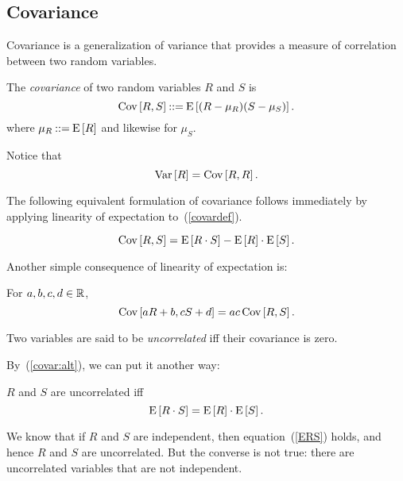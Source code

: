 \documentclass[11pt,twoside]{article}
\begin{document}

\subsection{Covariance}
Covariance is a generalization of variance that provides a measure of
correlation between two random variables.

\begin{definition*}
The \emph{covariance} of two random variables $R$ and $S$ is
\begin{equation}\label{covardef}
\mathop{\textup{Cov}}\nolimits\left[R,S\right] \mathbin{::=} \mathop{\textup{E}}\nolimits\left[(R - \mu_R)(S - \mu_S)\right].
\end{equation}
where $\mu_R \mathbin{::=} \mathop{\textup{E}}\nolimits\left[R\right]$ and likewise for $\mu_S$.
\end{definition*}

Notice that
\[
\mathop{\textup{Var}}\nolimits\left[R\right] = \mathop{\textup{Cov}}\nolimits\left[R,R\right].
\]

The following equivalent formulation of covariance follows immediately by
applying linearity of expectation to~(\ref{covardef}).
\begin{lemma*}
\begin{equation}\label{covar:alt}
\mathop{\textup{Cov}}\nolimits\left[R,S\right] = \mathop{\textup{E}}\nolimits\left[R\cdot S\right] - \mathop{\textup{E}}\nolimits\left[R\right] \cdot \mathop{\textup{E}}\nolimits\left[S\right].
\end{equation}
\end{lemma*}

Another simple consequence of linearity of expectation is:
\begin{lemma*}For $a,b,c,d \in \mathbb{R}$,
\begin{equation}\label{covaraR}
\mathop{\textup{Cov}}\nolimits\left[aR+b,cS+d\right] = ac\mathop{\textup{Cov}}\nolimits\left[R,S\right].
\end{equation}
\end{lemma*}

\begin{definition*}
Two variables are said to be \emph{uncorrelated} iff their covariance is
zero.
\end{definition*}

By~(\ref{covar:alt}), we can put it another way:
\begin{lemma*}
$R$ and $S$ are uncorrelated iff
\begin{equation}\label{ERS}
\mathop{\textup{E}}\nolimits\left[R\cdot S\right] = \mathop{\textup{E}}\nolimits\left[R\right] \cdot \mathop{\textup{E}}\nolimits\left[S\right].
\end{equation}
\end{lemma*}

We know that if $R$ and $S$ are independent, then equation~(\ref{ERS})
holds, and hence $R$ and $S$ are uncorrelated.  But the converse is not
true: there are uncorrelated variables that are not independent.
\end{document}
